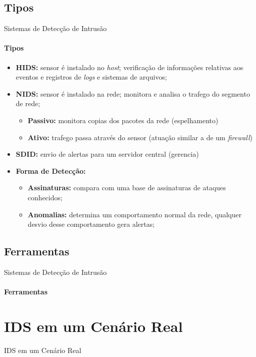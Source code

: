 \documentclass[aspectratio=169]{beamer}
\begin{document}
\subsection{Tipos}
\begin{frame}{Sistemas de Detecção de Intrusão}
    \framesubtitle{Tipos}
    \begin{itemize}
        \item \textbf{HIDS:} sensor é instalado no \textit{host}; verificação de informações relativas aos eventos e registros de \textit{logs} e sistemas de arquivos;
        \item \textbf{NIDS:} sensor é instalado na rede; monitora e analisa o trafego do segmento de rede;
            \begin{itemize}
                \item \textbf{Passivo:} monitora copias dos pacotes da rede (espelhamento)
                \item \textbf{Ativo:} trafego passa através do sensor (atuação similar a de um \textit{firewall})
            \end{itemize}
        \item \textbf{SDID:} envio de alertas para um servidor central (gerencia)
        \item \textbf{Forma de Detecção:}
            \begin{itemize}
                \item \textbf{Assinaturas:} compara com uma base de assinaturas de ataques conhecidos;
                \item \textbf{Anomalias:} determina um comportamento normal da rede, qualquer desvio desse comportamento gera alertas;
            \end{itemize}
    \end{itemize}
\end{frame}
\subsection{Ferramentas}
\begin{frame}{Sistemas de Detecção de Intrusão}
    \framesubtitle{Ferramentas}
\end{frame}
\section{IDS em um Cenário Real}
\begin{frame}{IDS em um Cenário Real}
\end{frame}
\end{document}
